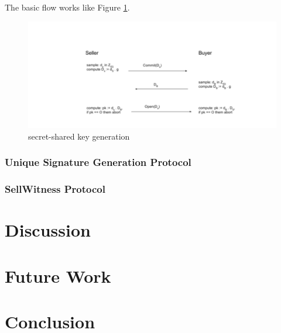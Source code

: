 \documentclass[12pt]{article}
\begin{document}
The basic flow works like Figure \ref{fig:secret_share}.

\begin{figure}
    \centering
    \includegraphics{secret_share.png}
    \caption{secret-shared key generation}
    \label{fig:secret_share}
\end{figure}

\subsubsection{Unique Signature Generation Protocol}
\label{sec:usg}

\subsubsection{SellWitness Protocol}

\section{Discussion}

\section{Future Work}

\section{Conclusion}



\newpage


\end{document}
